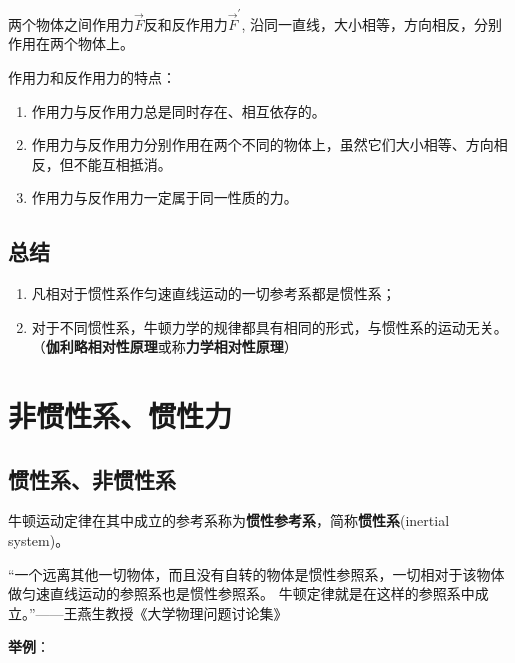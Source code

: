 \documentclass[
	12pt, %
	a4paper, %
]{myLegrandOrangeBook}
\begin{document}
    两个物体之间作用力\(\overrightarrow{F}\)反和反作用力\(\overrightarrow{F}^{'}\), 
    沿同一直线，大小相等，方向相反，分别作用在两个物体上。

    作用力和反作用力的特点：

    \begin{enumerate}
        \item 作用力与反作用力总是同时存在、相互依存的。
        \item 作用力与反作用力分别作用在两个不同的物体上，虽然它们大小相等、方向相反，但不能互相抵消。
        \item 作用力与反作用力一定属于同一性质的力。
    \end{enumerate}

\subsection{总结}

    \begin{enumerate}
        \item 凡相对于惯性系作匀速直线运动的一切参考系都是惯性系；
        \item 对于不同惯性系，牛顿力学的规律都具有相同的形式，与惯性系的运动无关。
            （\textbf{伽利略相对性原理}或称\textbf{力学相对性原理}）
    \end{enumerate}

\section{非惯性系、惯性力}

\subsection{惯性系、非惯性系}

    \vspace{1em}
    \begin{definition}[惯性系]

        牛顿运动定律在其中成立的参考系称为\textbf{惯性参考系}，简称\textbf{惯性系}(inertial system)。

        “一个远离其他一切物体，而且没有自转的物体是惯性参照系，一切相对于该物体做匀速直线运动的参照系也是惯性参照系。
        牛顿定律就是在这样的参照系中成立。”——王燕生教授《大学物理问题讨论集》
        
    \end{definition}

    \textbf{举例}：
\end{document}
